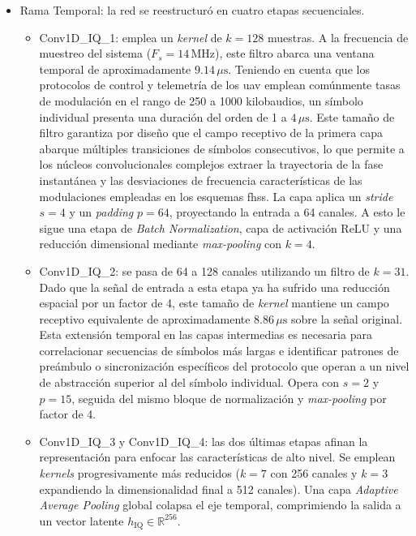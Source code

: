 \begin{itemize}
    \item Rama Temporal: la red se reestructuró en cuatro etapas secuenciales. 
    \begin{itemize}
        \item Conv1D\_IQ\_1: emplea un \textit{kernel} de $k=128$ muestras. A la frecuencia de muestreo del sistema ($F_s = 14$\,MHz), este filtro abarca una ventana temporal de aproximadamente $9.14\,\mu\text{s}$. Teniendo en cuenta que los protocolos de control y telemetría de los \gls{uav} emplean comúnmente tasas de modulación en el rango de 250 a 1000 kilobaudios, un símbolo individual presenta una duración del orden de 1 a $4\,\mu\text{s}$. Este tamaño de filtro garantiza por diseño que el campo receptivo de la primera capa abarque múltiples transiciones de símbolos consecutivos, lo que permite a los núcleos convolucionales complejos extraer la trayectoria de la fase instantánea y las desviaciones de frecuencia características de las modulaciones empleadas en los esquemas \gls{fhss}. La capa aplica un \textit{stride} $s=4$ y un \textit{padding} $p=64$, proyectando la entrada a 64 canales. A esto le sigue una etapa de \textit{Batch Normalization}, capa de activación ReLU y una reducción dimensional mediante \textit{max-pooling} con $k=4$.
        \item Conv1D\_IQ\_2: se pasa de 64 a 128 canales utilizando un filtro de $k=31$. Dado que la señal de entrada a esta etapa ya ha sufrido una reducción espacial por un factor de 4, este tamaño de \textit{kernel} mantiene un campo receptivo equivalente de aproximadamente $8.86\,\mu\text{s}$ sobre la señal original. Esta extensión temporal en las capas intermedias es necesaria para correlacionar secuencias de símbolos más largas e identificar patrones de preámbulo o sincronización específicos del protocolo que operan a un nivel de abstracción superior al del símbolo individual. Opera con $s=2$ y $p=15$, seguida del mismo bloque de normalización y \textit{max-pooling} por factor de 4.
        \item Conv1D\_IQ\_3 y Conv1D\_IQ\_4: las dos últimas etapas afinan la representación para enfocar las características de alto nivel. Se emplean \textit{kernels} progresivamente más reducidos ($k=7$ con 256 canales y $k=3$ expandiendo la dimensionalidad final a 512 canales). Una capa \textit{Adaptive Average Pooling} global colapsa el eje temporal, comprimiendo la salida a un vector latente $h_{\text{IQ}} \in \mathbb{R}^{256}$.

    \end{itemize}


\end{itemize}
